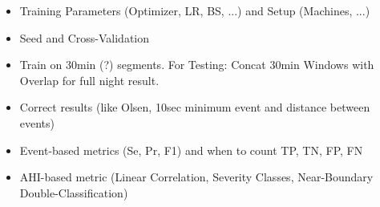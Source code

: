 \begin{itemize}
    \item Training Parameters (Optimizer, LR, BS, ...) and Setup (Machines, ...)
    \item Seed and Cross-Validation
    \item Train on 30min (?) segments. For Testing: Concat 30min Windows with Overlap for full night result.
    \item Correct results (like Olsen, 10sec minimum event and distance between events)
    \item Event-based metrics (Se, Pr, F1) and when to count TP, TN, FP, FN
    \item AHI-based metric (Linear Correlation, Severity Classes, Near-Boundary Double-Classification)
\end{itemize}

